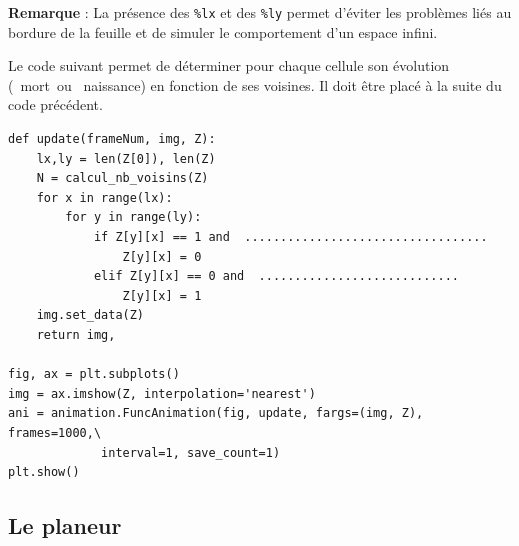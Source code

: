 
\textbf{Remarque} : La présence des \verb?%lx? et des \verb?%ly? permet d'éviter les problèmes liés au bordure de la feuille et de simuler le comportement d'un espace infini.

Le code suivant permet de déterminer pour chaque cellule son évolution (\og\ mort\fg\ ou \og\ naissance\fg) en fonction de ses voisines. Il doit être placé à la suite du code précédent.

\begin{verbatim}
def update(frameNum, img, Z):
    lx,ly = len(Z[0]), len(Z)
    N = calcul_nb_voisins(Z)
    for x in range(lx):
        for y in range(ly):
            if Z[y][x] == 1 and  ..................................
                Z[y][x] = 0
            elif Z[y][x] == 0 and  ............................
                Z[y][x] = 1
    img.set_data(Z)
    return img,

fig, ax = plt.subplots()
img = ax.imshow(Z, interpolation='nearest')
ani = animation.FuncAnimation(fig, update, fargs=(img, Z), frames=1000,\
			 interval=1, save_count=1)
plt.show()
\end{verbatim}


\newpage

\subsection{Le planeur}

